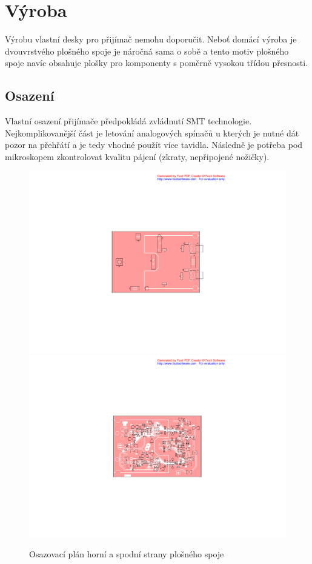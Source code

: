 \documentclass[12pt,a4paper,oneside]{article}
\begin{document}
\section{Výroba}
Výrobu vlastní desky pro přijímač nemohu doporučit. Neboť domácí výroba je dvouvrstvého plošného spoje je náročná sama o sobě a tento motiv plošného spoje navíc obsahuje plošky pro komponenty s poměrně vysokou třídou přesnosti.

\subsection{Osazení}
Vlastní osazení přijímače předpokládá zvládnutí SMT technologie. Nejkomplikovanější část je letování analogových spínačů u kterých je nutné dát pozor na přehřátí a je tedy vhodné použít více tavidla. Následně je potřeba pod mikroskopem zkontrolovat kvalitu pájení (zkraty, nepřipojené nožičky).

\begin{figure} [h!tbp]
  \centering
  \includegraphics[trim = 9.5cm 6.5cm 8.5cm 6.5cm, clip, width=18.5cm]{../../CAM_DOC/O1.pdf}
  \includegraphics[trim = 9.5cm 6.5cm 9.0cm 6.5cm, clip, width=18cm]{../../CAM_DOC/O2.pdf}
  \caption{Osazovací plán horní a spodní strany plošného spoje}
  \label{fig:osazovaci_plan}
\end{figure}
\end{document}
